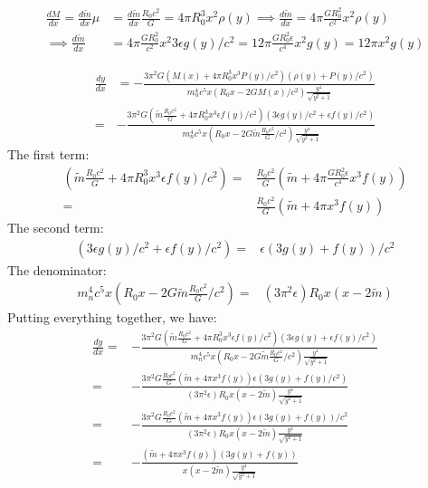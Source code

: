 \begin{align}
    \frac{dM}{dx}=\frac{d \tilde{m}}{dx} \mu &= \frac{d \tilde{m}}{dx} \frac{R_0 c^2}{G} = 4\pi R_0^3 x^2 \rho(y)\implies \frac{d \tilde{m}}{dx} = 4\pi \frac{G R_0^2}{c^2} x^2 \rho(y)\\
    \implies \frac{d \tilde{m}}{dx} &= 4\pi \frac{G R_0^2}{c^2} x^2 3\epsilon g(y)/c^2 = 12\pi \frac{G R_0^2 \epsilon}{c^4} x^2 g(y) = 12\pi x^2 g(y)
\end{align}

\begin{align}
    \frac{dy}{dx} &= -\frac{3\pi^2 G(M(x) + 4\pi R_0^3 x^3 P(y)/c^2)(\rho(y) + P(y)/c^2)}{m_n^4 c^5 x (R_0x - 2GM(x)/c^2) \frac{y^4}{\sqrt{y^2 + 1}}}\\
    =& -\frac{3\pi^2 G(\tilde{m} \frac{R_0 c^2}{G} + 4\pi R_0^3 x^3 \epsilon f(y)/c^2)(3\epsilon g(y)/c^2 + \epsilon f(y)/c^2)}{m_n^4 c^5 x (R_0x - 2G\tilde{m} \frac{R_0 c^2}{G}/c^2) \frac{y^4}{\sqrt{y^2 + 1}}}
\end{align}
The first term:
\begin{align}
    (\tilde{m} \frac{R_0 c^2}{G} + 4\pi R_0^3 x^3 \epsilon f(y)/c^2) =& \frac{R_0 c^2}{G} (\tilde{m} + 4\pi \frac{G R_0^2\epsilon}{c^4} x^3  f(y))\\
    =& \frac{R_0 c^2}{G} (\tilde{m} + 4\pi  x^3 f(y))
\end{align}
The second term:
\begin{align}
    (3\epsilon g(y)/c^2 + \epsilon f(y)/c^2) =& \epsilon (3 g(y) + f(y))/c^2
\end{align}
The denominator:
\begin{align}
    m_n^4 c^5  x (R_0x - 2G\tilde{m} \frac{R_0 c^2}{G}/c^2)  =& (3\pi^2 \epsilon) R_0 x (x - 2\tilde{m})
\end{align}
Putting everything together, we have:
\begin{align}
    \frac{dy}{dx} =& -\frac{3\pi^2 G(\tilde{m} \frac{R_0 c^2}{G} + 4\pi R_0^3 x^3 \epsilon f(y)/c^2)(3\epsilon g(y) + \epsilon f(y)/c^2)}{m_n^4 c^5 x (R_0x - 2G\tilde{m} \frac{R_0 c^2}{G}/c^2) \frac{y^4}{\sqrt{y^2 + 1}}}\\
    =& -\frac{3\pi^2 G \frac{R_0 c^2}{G} (\tilde{m} + 4\pi  x^3 f(y)) \epsilon (3 g(y) + f(y)/c^2)}{(3\pi^2 \epsilon) R_0 x (x - 2\tilde{m}) \frac{y^4}{\sqrt{y^2 + 1}}}\\
    =& -\frac{3\pi^2 G \frac{R_0 c^2}{G} (\tilde{m} + 4\pi  x^3 f(y)) \epsilon (3 g(y) + f(y))/c^2}{(3\pi^2 \epsilon) R_0 x (x - 2\tilde{m}) \frac{y^4}{\sqrt{y^2 + 1}}}\\
    =& -\frac{ (\tilde{m} + 4\pi  x^3 f(y)) (3 g(y) + f(y))}{ x (x - 2\tilde{m}) \frac{y^4}{\sqrt{y^2 + 1}}}
\end{align}
